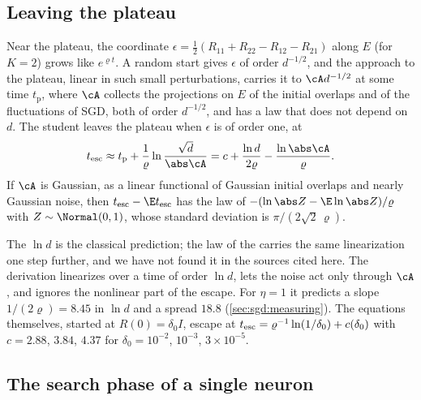 \begin{refsection}
\subsection{Leaving the plateau}

\begin{heuristic}
Near the plateau, the coordinate $\epsilon=\frac12(R_{11}+R_{22}-R_{12}-R_{21})$ along $E$ (for $K=2$) grows like $e^{\varrho t}$. A random start gives $\epsilon$ of order $d^{-1/2}$, and the approach to the plateau, linear in such small perturbations, carries it to $\cA d^{-1/2}$ at some time $t_{\mathrm p}$, where $\cA$ collects the projections on $E$ of the initial overlaps and of the fluctuations of SGD, both of order $d^{-1/2}$, and has a law that does not depend on $d$. The student leaves the plateau when $\epsilon$ is of order one, at
\begin{equation}\label{eq:sgd:escape}
\sgdesc\approx t_{\mathrm p}+\frac1\varrho\ln\frac{\sqrt d}{\abs\cA}=c+\frac{\ln d}{2\varrho}-\frac{\ln\abs\cA}\varrho.
\end{equation}
If $\cA$ is Gaussian, as a linear functional of Gaussian initial overlaps and nearly Gaussian noise, then $\sgdesc-\E\sgdesc$ has the law of $-(\ln\abs Z-\E\ln\abs Z)/\varrho$ with $Z\sim\Normal(0,1)$, whose standard deviation is $\pi/(2\sqrt2\,\varrho)$.
\end{heuristic}

The $\ln d$ is the classical prediction; the law of the  carries the same linearization one step further, and we have not found it in the sources cited here. The derivation linearizes over a time of order $\ln d$, lets the noise act only through $\cA$, and ignores the nonlinear part of the escape. For $\eta=1$ it predicts a slope $1/(2\varrho)=8.45$ in $\ln d$ and a spread $18.8$ (\cref{sec:sgd:measuring}). The equations themselves, started at $R(0)=\delta_0I$, escape at $t_{\mathrm{esc}}=\varrho^{-1}\ln(1/\delta_0)+c(\delta_0)$ with $c=2.88$, $3.84$, $4.37$ for $\delta_0=10^{-2}$, $10^{-3}$, $3\times10^{-5}$.

\subsection{The search phase of a single neuron}


\end{refsection}
